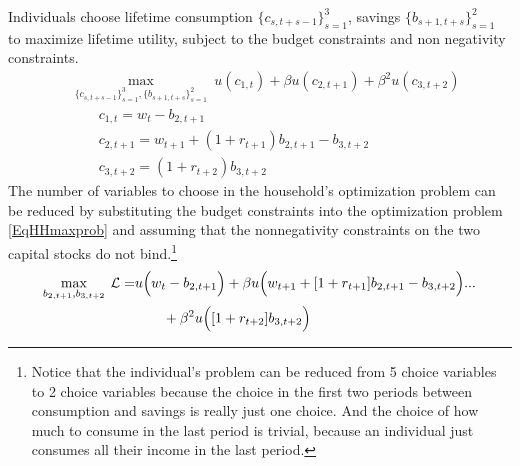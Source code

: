 \documentclass[letterpaper,12pt]{article}
\theoremstyle{definition}
\numberwithin{equation}{section}
\numberwithin{exercise}{section}
\begin{document}
\begin{spacing}{1.5}
      Individuals choose lifetime consumption $\{c_{s,t+s-1}\}_{s=1}^3$, savings $\{b_{s+1,t+s}\}_{s=1}^2$ to maximize lifetime utility, subject to the budget constraints and non negativity constraints.
      \begin{equation}\label{EqHHmaxprob}
         \begin{split}
            &\max_{\{c_{s,t+s-1}\}_{s=1}^3,\{b_{s+1,t+s}\}_{s=1}^2}\:u(c_{1,t}) + \beta u(c_{2,t+1}) + \beta^2 u(c_{3,t+2}) \\
            &\quad\quad c_{1,t} = w_t - b_{2,t+1} \\
            &\quad\quad c_{2,t+1} = w_{t+1} + (1 + r_{t+1})b_{2,t+1} - b_{3,t+2} \\
            &\quad\quad c_{3,t+2} = (1 + r_{t+2})b_{3,t+2}
         \end{split}
      \end{equation}
      The number of variables to choose in the household's optimization problem can be reduced by substituting the budget constraints into the optimization problem \eqref{EqHHmaxprob} and assuming that the nonnegativity constraints on the two capital stocks do not bind.\footnote{Notice that the individual's problem can be reduced from 5 choice variables to 2 choice variables because the choice in the first two periods between consumption and savings is really just one choice. And the choice of how much to consume in the last period is trivial, because an individual just consumes all their income in the last period.}
      \begin{equation}\label{EqHHlagrang}
         \begin{split}
            \max_{b_{2,t+1},b_{3,t+2}}\:\mathcal{L} = &u\Bigl(w_t - b_{2,t+1}\Bigr) + \beta u\Bigl(w_{t+1} + [1 + r_{t+1}]b_{2,t+1} - b_{3,t+2}\Bigr) ... \\
            &\quad\quad + \beta^2 u\Bigl([1 + r_{t+2}]b_{3,t+2}\Bigr)
         \end{split}
      \end{equation}


\end{spacing}
\end{document}
